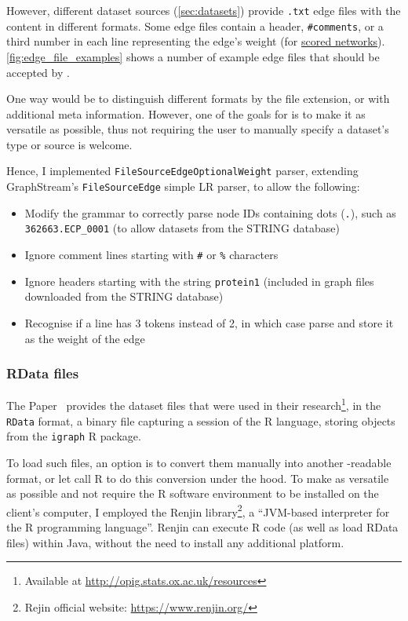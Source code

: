 However, different dataset sources (\autoref{sec:datasets}) provide \texttt{.txt} edge files with the content in different formats.
Some edge files contain a header, \texttt{\#comments}, or a third number in each line representing the edge's weight (for \hyperref[sec:scored_networks]{scored networks}).
\autoref{fig:edge_file_examples} shows a number of example edge files that should be accepted by \graffs.



One way would be to distinguish different formats by the file extension, or with additional meta information.
However, one of the goals for \graffs is to make it as versatile as possible, thus not requiring the user to manually specify a dataset's type or source is welcome.

Hence, I implemented \texttt{FileSourceEdgeOptionalWeight} parser, extending GraphStream's \texttt{FileSourceEdge} simple LR parser, to allow the following:
\begin{itemize}[topsep=5pt]
    \item Modify the grammar to correctly parse node IDs containing dots (\texttt{.}), such as \texttt{362663.ECP\_0001} (to allow datasets from the STRING database)
    \item Ignore comment lines starting with \texttt{\#} or \texttt{\%} characters
    \item Ignore headers starting with the string \texttt{protein1} (included in graph files downloaded from the STRING database)
    \item Recognise if a line has 3 tokens instead of 2, in which case parse and store it as the weight of the edge
\end{itemize}

\subsubsection{RData files}\label{sec:rdata_files}

The Paper~\cite{Bozhilova2019} provides the dataset files that were used in their research\footnote{Available at \url{http://opig.stats.ox.ac.uk/resources}}, in the \texttt{RData} format, a binary file capturing a session of the R language, storing objects from the \texttt{igraph} R package.

To load such files, an option is to convert them manually into another \graffs-readable format, or let \graffs call R to do this conversion under the hood.
To make \graffs as versatile as possible and not require the R software environment to be installed on the client's computer, I employed the Renjin library\footnote{Rejin official website: \url{https://www.renjin.org/}}, a \enquote{JVM-based interpreter for the R programming language}.
Renjin can execute R code (as well as load RData files) within Java, without the need to install any additional platform.

